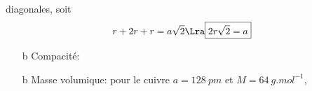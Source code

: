 \documentclass[../../main/main.tex]{subfiles}
\begin{document}
\begin{tcb*}[breakable]
\begin{minipage}[t]{.72\linewidth}
\begin{itemize}
{{					diagonales}, soit
				\[
					r + 2r + r = a \sqrt{2} \Lra \boxed{2r \sqrt{2} = a}
				\]
			}%
		\end{itemize}
	\end{minipage}
	\hfill
	\begin{minipage}[t]{.24\linewidth}
		\vspace{0pt}
		\begin{center}
		\end{center}
	\end{minipage}
	\begin{itemize}
		\item[b]{Compacité}:
		\leavevmode\vspace*{-25pt}\relax
		\item[b]{Masse volumique}: pour le cuivre $a = \SI{128}{pm}$ et $M =
			\SI{64}{g.mol^{-1}}$,
		\vspace{-20pt}
	\end{itemize}
\end{tcb*}
\end{document}
